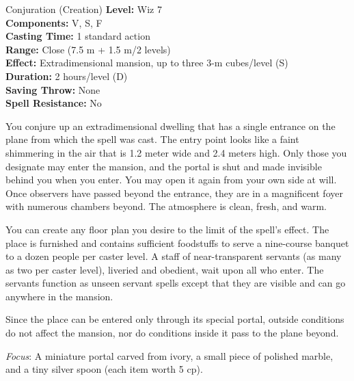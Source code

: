 {Conjuration (Creation)}
{
	\textbf{Level:}
	Wiz 7\\
	\textbf{Components:}
	V, S, F\\
	\textbf{Casting Time:}
	1 standard action\\
	\textbf{Range:}
	Close (7.5 m + 1.5 m/2 levels)\\
	\textbf{Effect:}
	Extradimensional mansion, up to three 3-m cubes/level (S)\\
	\textbf{Duration:}
	2 hours/level (D)\\
	\textbf{Saving Throw:}
	None\\
	\textbf{Spell Resistance:}
	No\\
}
{
	You conjure up an extradimensional dwelling that has a single entrance on the plane from which the spell was cast. The entry point looks like a faint shimmering in the air that is 1.2 meter wide and 2.4 meters high. Only those you designate may enter the mansion, and the portal is shut and made invisible behind you when you enter. You may open it again from your own side at will. Once observers have passed beyond the entrance, they are in a magnificent foyer with numerous chambers beyond. The atmosphere is clean, fresh, and warm.

	You can create any floor plan you desire to the limit of the spell's effect. The place is furnished and contains sufficient foodstuffs to serve a nine-course banquet to a dozen people per caster level. A staff of near-transparent servants (as many as two per caster level), liveried and obedient, wait upon all who enter. The servants function as unseen servant spells except that they are visible and can go anywhere in the mansion.

	Since the place can be entered only through its special portal, outside conditions do not affect the mansion, nor do conditions inside it pass to the plane beyond.

	\textit{Focus}:
	A miniature portal carved from ivory, a small piece of polished marble, and a tiny silver spoon (each item worth 5 cp).

}
